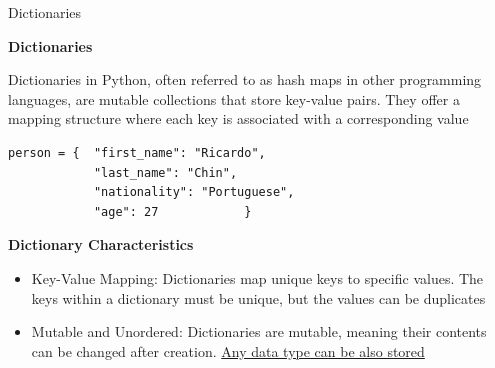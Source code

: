 \documentclass[
	11pt, 
]{beamer}
\begin{document}
\begin{frame}[fragile]{Dictionaries}
    \scriptsize
\begin{block}{\textbf{Dictionaries}}
    
Dictionaries in Python, often referred to as hash maps in other programming languages, are mutable collections that store key-value pairs. They offer a mapping structure where each key is associated with a corresponding value

\end{block}

\begin{verbatim}
person = {  "first_name": "Ricardo",
            "last_name": "Chin",
            "nationality": "Portuguese",
            "age": 27            }
\end{verbatim}

\begin{exampleblock}{\textbf{Dictionary Characteristics}}
    \begin{itemize}
        \item Key-Value Mapping: Dictionaries map unique keys to specific values. The keys within a dictionary must be unique, but the values can be duplicates
        \item Mutable and Unordered: Dictionaries are mutable, meaning their contents can be changed after creation. \underline{Any data type can be also stored}
    \end{itemize}    
\end{exampleblock}
    
\end{frame}


\end{document}

